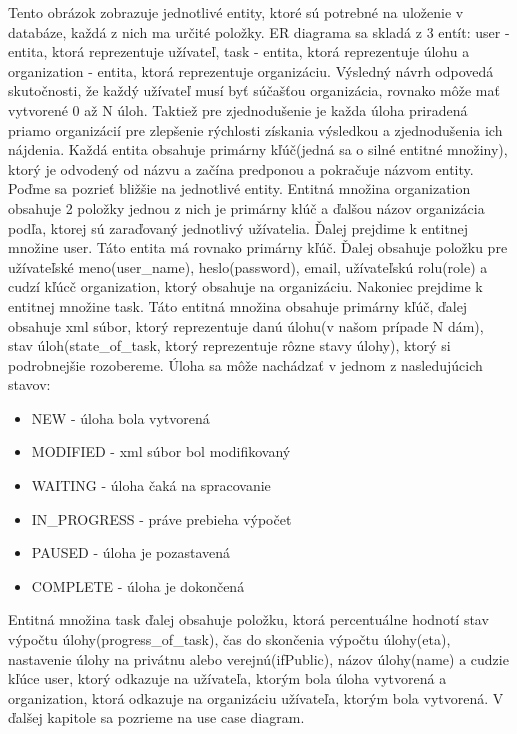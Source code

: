 Tento obrázok zobrazuje jednotlivé entity, ktoré sú potrebné na uloženie v databáze, každá z nich ma určité položky. ER diagrama sa skladá z 3 entít: user - entita, ktorá reprezentuje užívateľ, task - entita, ktorá reprezentuje úlohu a organization - entita, ktorá reprezentuje organizáciu. Výsledný návrh odpovedá skutočnosti, že každý užívateľ musí byť súčašťou organizácia, rovnako môže mať vytvorené 0 až N úloh. Taktiež pre zjednodušenie je každa úloha priradená priamo organizácií pre zlepšenie rýchlosti získania výsledkou a zjednodušenia ich nájdenia. Každá entita obsahuje primárny kľúč(jedná sa o silné entitné množiny), ktorý je odvodený od názvu a začína predponou  a pokračuje názvom entity. Poďme sa pozrieť bližšie na jednotlivé entity. Entitná množina organization obsahuje 2 položky jednou z nich je primárny klúč a ďalšou názov organizácia podľa, ktorej sú zaraďovaný jednotlivý užívatelia. Ďalej prejdime k entitnej množine user. Táto entita má rovnako primárny kľúč. Ďalej obsahuje položku pre užívateľské meno(user\_name), heslo(password), email, užívateľskú rolu(role) a cudzí kľúcč organization, ktorý obsahuje na organizáciu. Nakoniec prejdime k entitnej množine task. Táto entitná množina obsahuje primárny kľúč, ďalej obsahuje xml súbor, ktorý reprezentuje danú úlohu(v našom prípade N dám), stav úloh(state\_of\_task, ktorý reprezentuje rôzne stavy úlohy), ktorý si podrobnejšie rozobereme. Úloha sa môže nachádzať v jednom z nasledujúcich stavov:
\begin{itemize}
\item NEW - úloha bola vytvorená
\item MODIFIED - xml súbor bol modifikovaný
\item WAITING - úloha čaká na spracovanie
\item IN\_PROGRESS - práve prebieha výpočet
\item PAUSED - úloha je pozastavená
\item COMPLETE - úloha je dokončená
\end{itemize}
Entitná množina task ďalej obsahuje položku, ktorá percentuálne hodnotí stav výpočtu úlohy(progress\_of\_task), čas do skončenia výpočtu úlohy(eta), nastavenie úlohy na privátnu alebo verejnú(ifPublic), názov úlohy(name) a cudzie kľúce user, ktorý odkazuje na užívateľa, ktorým bola úloha vytvorená a organization, ktorá odkazuje na organizáciu užívateľa, ktorým bola vytvorená. V ďalšej kapitole sa pozrieme na use case diagram.

